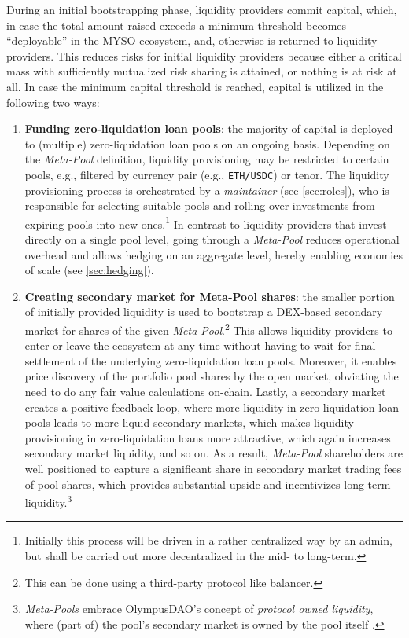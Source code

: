 \documentclass[a4paper]{article}
\begin{document}
During an initial bootstrapping phase, liquidity providers commit capital, which, in case the total amount raised exceeds a minimum threshold becomes ``deployable'' in the MYSO ecosystem, and, otherwise is returned to liquidity providers. This reduces risks for initial liquidity providers because either a critical mass with sufficiently mutualized risk sharing is attained, or nothing is at risk at all. In case the minimum capital threshold is reached, capital is utilized in the following two ways: 
\begin{enumerate}[i]
    \item \textbf{Funding zero-liquidation loan pools}: the majority of capital is deployed to (multiple) zero-liquidation loan pools on an ongoing basis. Depending on the \emph{Meta-Pool} definition, liquidity provisioning may be restricted to certain pools, e.g., filtered by currency pair (e.g., \verb|ETH/USDC|) or tenor. The liquidity provisioning process is orchestrated by a \emph{maintainer} (see \cref{sec:roles}), who is responsible for selecting suitable pools and rolling over investments from expiring pools into new ones.\footnote{Initially this process will be driven in a rather centralized way by an admin, but shall be carried out more decentralized in the mid- to long-term.} In contrast to liquidity providers that invest directly on a single pool level, going through a \emph{Meta-Pool} reduces operational overhead and allows hedging on an aggregate level, hereby enabling economies of scale (see \cref{sec:hedging}).
    \item \textbf{Creating secondary market for Meta-Pool shares}: the smaller portion of initially provided liquidity is used to bootstrap a DEX-based secondary market for shares of the given \emph{Meta-Pool}.\footnote{This can be done using a third-party protocol like balancer.} This allows liquidity providers to enter or leave the ecosystem at any time without having to wait for final settlement of the underlying zero-liquidation loan pools. Moreover, it enables price discovery of the portfolio pool shares by the open market, obviating the need to do any fair value calculations on-chain. Lastly, a secondary market creates a positive feedback loop, where more liquidity in zero-liquidation loan pools leads to more liquid secondary markets, which makes liquidity provisioning in zero-liquidation loans more attractive, which again increases secondary market liquidity, and so on. As a result, \emph{Meta-Pool} shareholders are well positioned to capture a significant share in secondary market trading fees of pool shares, which provides substantial upside and incentivizes long-term liquidity.\footnote{\emph{Meta-Pools} embrace OlympusDAO's concept of \emph{protocol owned liquidity}, where (part of) the pool's secondary market is owned by the pool itself \cite{olympus}.}
\end{enumerate}
\end{document}

